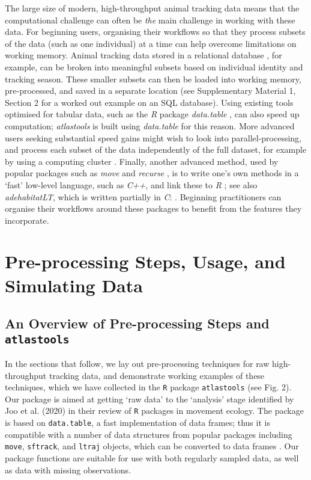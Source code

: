 \begin{refsection}
    The large size of modern, high-throughput animal tracking data means that the computational challenge can often be \textit{the} main challenge in working with these data.
    For beginning users, organising their workflows so that they process subsets of the data (such as one individual) at a time can help overcome limitations on working memory.
    Animal tracking data stored in a relational database \cite[e.g. SQL databases][]{codd1970}, for example, can be broken into meaningful subsets based on individual identity and tracking season.
    These smaller subsets can then be loaded into working memory, pre-processed, and saved in a separate location (see Supplementary Material 1, Section 2 for a worked out example on an SQL database).
    Using existing tools optimised for tabular data, such as the \textit{R} package \textit{data.table} \cite{dowle2020}, can also speed up computation; \textit{atlastools} is built using \textit{data.table} for this reason.
    More advanced users seeking substantial speed gains might wish to look into parallel-processing, and process each subset of the data independently of the full dataset, for example by using a computing cluster \cite[see also][for an alternative]{zjdai2021}.
    Finally, another advanced method, used by popular packages such as \textit{move} \cite{kranstauber2011} and \textit{recurse} \cite{bracis2018}, is to write one's own methods in a `fast' low-level language, such as \textit{C++}, and link these to \textit{R} \cite[][]{eddelbuettel2013}; see also \textit{adehabitatLT}, which is written partially in \textit{C}: \cite{calenge2006}.
    Beginning practitioners can organise their workflows around these packages to benefit from the features they incorporate.

    \section{Pre-processing Steps, Usage, and Simulating Data}

    \subsection{An Overview of Pre-processing Steps and \texttt{atlastools}}

    In the sections that follow, we lay out pre-processing techniques for raw high-throughput tracking data, and demonstrate working examples of these techniques, which we have collected in the \texttt{R} package \texttt{atlastools} (see Fig. 2).
    Our package is aimed at getting `raw data' to the `analysis' stage identified by Joo et al. (2020) in their review of \texttt{R} packages in movement ecology.
    The package is based on \texttt{data.table}, a fast implementation of data frames; thus it is compatible with a number of data structures from popular packages including \texttt{move}, \texttt{sftrack}, and \texttt{ltraj} objects, which can be converted to data frames \citep[][]{kranstauber2011,boone2020,calenge2009}.
    Our package functions are suitable for use with both regularly sampled data, as well as data with missing observations.


\end{refsection}
